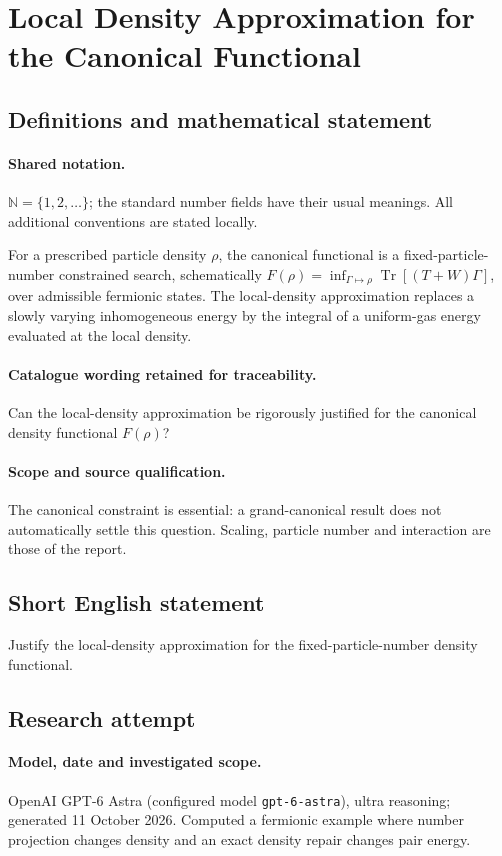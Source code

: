 \documentclass[11pt]{article}
\begin{document}
\section{Local Density Approximation for the Canonical Functional}\label{statement}

\subsection{Definitions and mathematical statement}

\paragraph{Shared notation.}$\mathbb N=\{1,2,\ldots\}$; the standard number fields have their usual meanings. All additional conventions are stated locally.


For a prescribed particle density $\rho$, the canonical functional is a fixed-particle-number constrained search, schematically $F(\rho)=\inf_{\Gamma\mapsto\rho}\operatorname{Tr}[(T+W)\Gamma]$, over admissible fermionic states. The local-density approximation replaces a slowly varying inhomogeneous energy by the integral of a uniform-gas energy evaluated at the local density.

\paragraph{Catalogue wording retained for traceability.}
Can the local-density approximation be rigorously justified for the canonical density functional $F(\rho)$?

\paragraph{Scope and source qualification.}The canonical constraint is essential: a grand-canonical result does not automatically settle this question. Scaling, particle number and interaction are those of the report.
\subsection{Short English statement}
Justify the local-density approximation for the fixed-particle-number density functional.
\subsection{Research attempt}
\paragraph{Model, date and investigated scope.}
OpenAI GPT-6 Astra (configured model \texttt{gpt-6-astra}), ultra reasoning; generated 11 October 2026. Computed a fermionic example where number projection changes density and an exact density repair changes pair energy.
\end{document}
